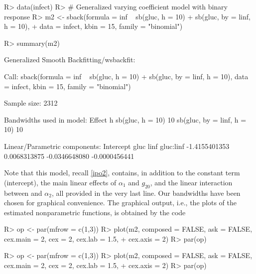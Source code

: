 \begin{Schunk}
\begin{Sinput}
R> data(infect)
R> # Generalized varying coefficient model with binary response
R> m2 <- sback(formula = inf ~ sb(gluc, h = 10) + sb(gluc, by = linf, h = 10), 
+   data = infect, kbin = 15, family = "binomial")
 
R> summary(m2)
\end{Sinput}
\begin{Soutput}
Generalized Smooth Backfitting/wsbackfit:

Call: sback(formula = inf ~ sb(gluc, h = 10) + sb(gluc, by = linf, 
    h = 10), data = infect, kbin = 15, family = "binomial")

Sample size: 2312 

Bandwidths used in model:
 Effect                      h 
 sb(gluc, h = 10)            10
 sb(gluc, by = linf, h = 10) 10

Linear/Parametric components:
    Intercept          gluc          linf     gluc:linf 
-1.4155401353  0.0068313875 -0.0346648080 -0.0000456441  
\end{Soutput}
\end{Schunk}

Note that this model, recall \eqref{ipo2}, contains, in addition to the constant term (intercept), 
the main linear effects of  $\alpha_1$ and   $g_{20}$, and the linear interaction between   and   $\alpha_2$, all provided in the very last line. Our bandwidths have been chosen for graphical convenience. The graphical output, i.e., the plots of the estimated nonparametric functions, is obtained by the code

\begin{Schunk}
\begin{Sinput}
R> op <- par(mfrow = c(1,3))
R> plot(m2, composed = FALSE, ask = FALSE, cex.main = 2, cex = 2, cex.lab = 1.5, 
+    cex.axis = 2)
R> par(op)

R> op <- par(mfrow = c(1,3))
R> plot(m2, composed = FALSE, ask = FALSE, cex.main = 2, cex = 2, cex.lab = 1.5, 
+    cex.axis = 2)
R> par(op)
\end{Sinput}
\end{Schunk}

